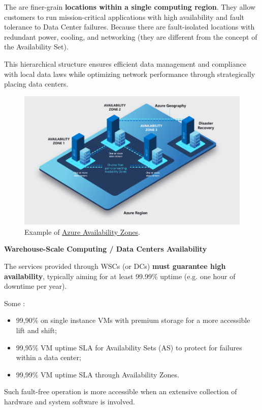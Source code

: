 \highspace
The  are finer-grain \textbf{locations within a single computing region}. They allow customers to run mission-critical applications with high availability and fault tolerance to Data Center failures. Because there are fault-isolated locations with redundant power, cooling, and networking (they are different from the concept of the Availability Set).

\highspace
This hierarchical structure ensures efficient data management and compliance with local data laws while optimizing network performance through strategically placing data centers.

\begin{figure}[!htp]
    \centering
    \includegraphics[width=.8\textwidth]{img/availability-zones-region-geography.png}
    \caption{Example of \href{https://learn.microsoft.com/en-us/azure/reliability/availability-zones-overview?tabs=azure-cli}{Azure Availability Zones}.}
\end{figure}

\newpage

\begin{center}
    \textcolor{Red2}{\textbf{Warehouse-Scale Computing / Data Centers Availability}}
\end{center}

The services provided through WSCs (or DCs) \textbf{must guarantee high availability}, typically aiming for at least 99.99\% uptime (e.g. one hour of downtime per year).

\highspace
Some :
\begin{itemize}
    \item 99,90\% on single instance VMs with premium storage for a more accessible lift and shift;
    
    \item 99,95\% VM uptime SLA for Availability Sets (AS) to protect for failures within a data center;

    \item 99,99\% VM uptime SLA through Availability Zones.
\end{itemize}
Such fault-free operation is more accessible when an extensive collection of hardware and system software is involved.

